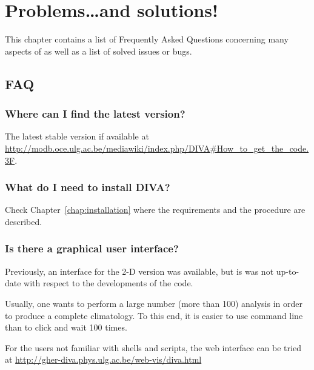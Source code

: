 \chapter{Problems\ldots and solutions!}

This chapter contains a list of Frequently Asked Questions concerning many aspects of \diva as well as a list of solved issues or bugs.

\minitoc


\section{FAQ}

\subsection{Where can I find the latest version?}

The latest stable version if available at \url{http://modb.oce.ulg.ac.be/mediawiki/index.php/DIVA#How_to_get_the_code.3F}. 


\subsection{What do I need to install DIVA?}

Check Chapter~\ref{chap:installation} where the requirements and the procedure are described.


\subsection{Is there a graphical user interface?}

Previously, an interface for the 2-D version was available, but is was not up-to-date with respect to the developments of the code.

Usually, one wants to perform a large number (more than 100) analysis in order to produce a complete climatology. To this end, it is easier to use command line than to click and wait 100 times.

For the users not familiar with shells and scripts, the web interface \citep{BARTH10} can be tried at \url{http://gher-diva.phys.ulg.ac.be/web-vis/diva.html}

